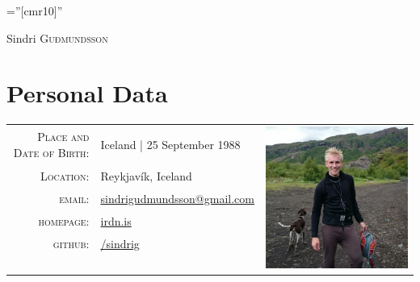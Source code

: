 \documentclass[a4paper,10pt]{article}
\begin{document}
\pagestyle{empty} %

\font\fb=''[cmr10]'' %

\par{\centering
		{\Huge Sindri \textsc{Guðmundsson}
	}\bigskip\par}

\section{Personal Data}

\begin{tabular}{rlr}
    \textsc{Place and Date of Birth:} & Iceland | 25 September 1988
    &\multirow{9}{*}{\includegraphics[scale=0.18]{sindri}}\\
    \textsc{Location:}   & Reykjavík, Iceland \\
    \textsc{email:}     & \href{mailto:sindrigudmundsson@gmail.com}{sindrigudmundsson@gmail.com}\\
    \textsc{homepage:}     & \href{https://irdn.is}{irdn.is} \\
    \textsc{github:}     & \href{https://github.com/sindrig}{/sindrig} \\
    \multicolumn{3}{c}{} \\
    \multicolumn{3}{c}{} \\
    \multicolumn{3}{c}{} \\
    \multicolumn{3}{c}{} \\
\end{tabular}
\end{document}
